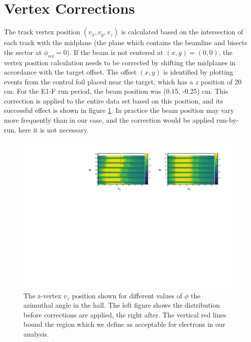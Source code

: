 \section{Vertex Corrections}
The track vertex position $(v_x, v_y, v_z)$ is calculated based on the intersection of each track with the midplane (the plane which contains the beamline and bisects the sector at $\phi_{rel} = 0$).  If the beam is not centered at $(x,y)=(0,0)$, the vertex position calculation needs to be corrected by shifting the midplanes in accordance with the target offset.  The offset $(x,y)$ is identified by plotting events from the control foil placed near the target, which has a $z$ position of 20 cm. For the E1-F run period, the beam position was (0.15, -0.25) cm.  This correction is applied to the entire data set based on this position, and its successful effect is shown in figure \ref{fig:vertex_phi}.  In practice the beam position may vary more frequently than in our case, and the correction would be applied run-by-run, here it is not necessary.  \\

\begin{figure}
	\label{fig:vertex_phi}
	\begin{center}
		\includegraphics[width=14cm]{image/plots/basic-analysis/vertex-phi.pdf}
		\caption{The z-vertex $v_z$ position shown for different values of $\phi$ the azimuthal angle in the hall.  The left figure shows the distribution before corrections are applied, the right after.  The vertical red lines bound the region which we define as acceptable for electrons in our analysis.}
	\end{center}
\end{figure}

